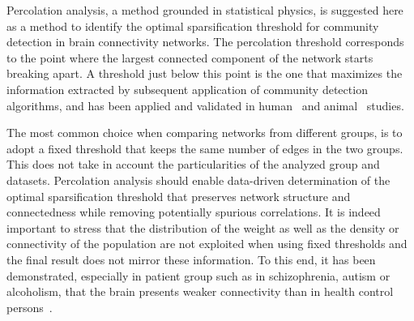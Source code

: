 Percolation analysis, a method grounded in statistical physics, is suggested here as a method to identify the optimal sparsification threshold for community detection in brain connectivity networks.
The percolation threshold corresponds to the point where the largest connected component of the network starts breaking apart.
A threshold just below this point is the one that maximizes the information extracted by subsequent application of community detection algorithms, and has been applied and validated in human~\cite{gallos2012} and animal~\cite{bardella2016a} studies.

The most common choice when comparing networks from different groups, is to adopt a fixed threshold that keeps the same number of edges in the two groups.
This does not take in account the particularities of the analyzed group and datasets.
Percolation analysis should enable data-driven determination of the optimal sparsification threshold that preserves network structure and connectedness while removing potentially spurious correlations.
It is indeed important to stress that the distribution of the weight as well as the density or connectivity of the population are not exploited when using fixed thresholds and the final result does not mirror these information.
To this end, it has been demonstrated, especially in patient group such as in schizophrenia, autism or alcoholism, that the brain presents weaker connectivity than in health control persons~\cite{alexander-bloch2010}.

